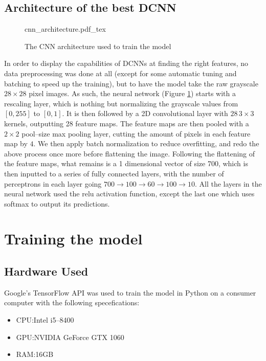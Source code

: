 \documentclass[conference]{IEEEtran}
\begin{document}
\subsection{Architecture of the best DCNN}\label{sec:train}
\begin{figure}[!htp]
    \centering
    \def\svgwidth{\columnwidth}
    \scriptsize
    {cnn_architecture.pdf_tex}
    \caption{The CNN architecture used to train the model}\label{fig:cnn_architecture}
\end{figure}
In order to display the capabilities of DCNNs at finding the right features, no data preprocessing was done at all (except for some automatic tuning and batching to speed up the training), but to have the model take the raw grayscale $28 \times 28$ pixel images.\@
As such, the neural network (Figure \ref{fig:cnn_architecture}) starts with a rescaling layer, which is nothing but normalizing the grayscale values from $[0, 255]$ to $[0, 1]$. It is then followed by a 2D convolutional layer with $28 \, 3 \times 3$ kernels, outputting 28 feature maps. The feature maps are then pooled with a $2 \times 2$ pool--size max pooling layer, cutting the amount of pixels in each feature map by $4$. We then apply batch normalization\cite{batchnorm} to reduce overfitting, and redo the above process once more before flattening the image.\@
Following the flattening of the feature maps, what remains is a 1 dimensional vector of size 700, which is then inputted to a series of fully connected layers, with the number of perceptrons in each layer going $700 \to 100 \to 60 \to 100 \to 10$. All the layers in the neural network used the relu activation function, except the last one which uses softmax to output its predictions.
\section{Training the model}
\subsection{Hardware Used}
Google's TensorFlow API\cite{tensorflow2015-whitepaper} was used to train the model in Python on a consumer computer with the following specefications:
\begin{itemize}
    \item CPU:\@ Intel i5--8400
    \item GPU:\@ NVIDIA GeForce GTX 1060
    \item RAM:\@ 16GB
\end{itemize}
\end{document}
